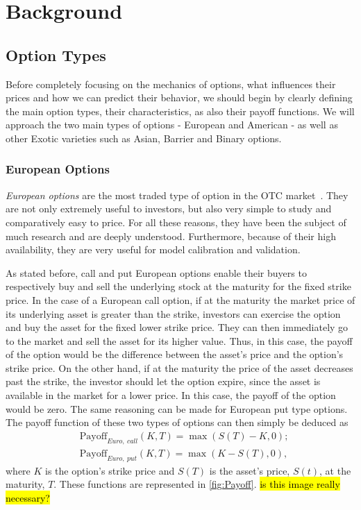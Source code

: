 \chapter{Background}
\label{chapter:background}
\section{Option Types}
Before completely focusing on the mechanics of options, what influences their prices and how we can predict their behavior, we should begin by clearly defining the main option types, their characteristics, as also their payoff functions. We will approach the two main types of options - European and American - as well as other Exotic varieties such as Asian, Barrier and Binary options.





\subsection{European Options}
\emph{European options} are the most traded type of option in the OTC market~\cite{InvEuro}. They are not only extremely useful to investors, but also very simple to study and comparatively easy to price. For all these reasons, they have been the subject of much research and are deeply understood. Furthermore, because of their high availability, they are very useful for model calibration and validation.


As stated before, call and put European options enable their buyers to respectively buy and sell the underlying stock at the maturity for the fixed strike price.
In the case of a European call option, if at the maturity the market price of its underlying asset is greater than the strike, investors can exercise the option and buy the asset for the fixed lower strike price. They can then immediately go to the market and sell the asset for its higher value. Thus, in this case, the payoff of the option would be the difference between the asset's price and the option's strike price. On the other hand, if at the maturity the price of the asset decreases past the strike, the investor should let the option expire, since the asset is available in the market for a lower price. In this case, the payoff of the option would be zero.
The same reasoning can be made for European put type options.
The payoff function of these two types of options can then simply be deduced as
\begin{equation}\label{callput}
\begin{split}
&\text{Payoff}_{Euro,\ call}(K,T)=\max\left(S(T)-K,0\right);\\
&\text{Payoff}_{Euro,\ put}(K,T)=\max\left(K-S(T),0\right),
\end{split}
\end{equation}
\noindent where $K$ is the option's strike price and $S(T)$ is the asset's price, $S(t)$, at the maturity, $T$. These functions are represented in \autoref{fig:Payoff}. \hl{is this image really necessary?}


